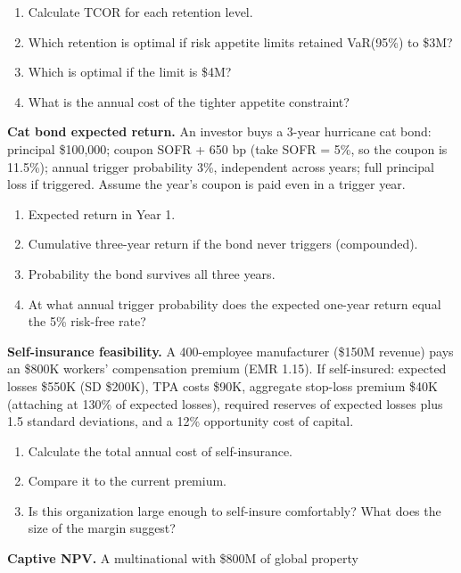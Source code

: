 \documentclass[11pt,openany]{book}
\providecommand{\tightlist}{\setlength{\itemsep}{0pt}\setlength{\parskip}{0pt}}
\begin{document}
\begin{shortanswerquestions}
  \begin{enumerate}[label=\alph*)]\tightlist
    \item Calculate TCOR for each retention level.
    \item Which retention is optimal if risk appetite limits retained
          VaR(95\%) to \$3M?
    \item Which is optimal if the limit is \$4M?
    \item What is the annual cost of the tighter appetite constraint?
  \end{enumerate}
\item \textbf{Cat bond expected return.} An investor buys a 3-year hurricane
  cat bond: principal \$100,000; coupon SOFR + 650 bp (take SOFR = 5\%, so
  the coupon is 11.5\%); annual trigger probability 3\%, independent across
  years; full principal loss if triggered. Assume the year's coupon is paid
  even in a trigger year.
  \begin{enumerate}[label=\alph*)]\tightlist
    \item Expected return in Year 1.
    \item Cumulative three-year return if the bond never triggers
          (compounded).
    \item Probability the bond survives all three years.
    \item At what annual trigger probability does the expected one-year
          return equal the 5\% risk-free rate?
  \end{enumerate}
\item \textbf{Self-insurance feasibility.} A 400-employee manufacturer
  (\$150M revenue) pays an \$800K workers' compensation premium (EMR 1.15).
  If self-insured: expected losses \$550K (SD \$200K), TPA costs \$90K,
  aggregate stop-loss premium \$40K (attaching at 130\% of expected losses),
  required reserves of expected losses plus 1.5 standard deviations, and a
  12\% opportunity cost of capital.
  \begin{enumerate}[label=\alph*)]\tightlist
    \item Calculate the total annual cost of self-insurance.
    \item Compare it to the current premium.
    \item Is this organization large enough to self-insure comfortably? What
          does the size of the margin suggest?
  \end{enumerate}
\item \textbf{Captive NPV.} A multinational with \$800M of global property

\end{shortanswerquestions}
\end{document}
